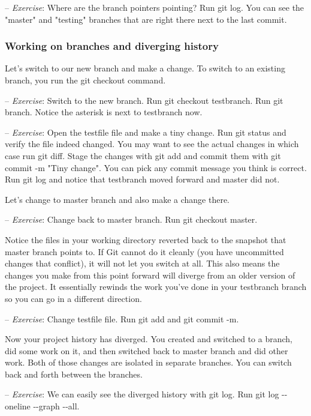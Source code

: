 \documentclass[12pt,a4]{article}
\newcommand{\ilcode}[1]{\textcolor[RGB]{160, 110, 220}{#1}}
\begin{document}
{\sf -- \emph{Exercise}:} Where are the branch pointers pointing? Run
\ilcode{git log}. You can see the "master" and "testing" branches that are right
there next to the last commit.

\subsubsection{Working on branches and diverging history}

Let's switch to our new branch and make a change. To switch to an existing
branch, you run the \ilcode{git checkout} command.

{\sf -- \emph{Exercise}:} Switch to the new branch. Run \ilcode{git checkout
testbranch}. Run \ilcode{git branch}. Notice the asterisk is next to testbranch
now.

{\sf -- \emph{Exercise}:} Open the testfile file and make a tiny change. Run
\ilcode{git status} and verify the file indeed changed. You may want to see the
actual changes in which case run \ilcode{git diff}. Stage the changes with
\ilcode{git add} and commit them with \ilcode{git commit -m "Tiny change"}. You
can pick any commit message you think is correct. Run \ilcode{git log} and
notice that testbranch moved forward and master did not.

Let's change to master branch and also make a change there.

{\sf -- \emph{Exercise}:} Change back to master branch. Run \ilcode{git checkout
master}.

Notice the files in your working directory reverted back to the snapshot that
master branch points to. If Git cannot do it cleanly (you have uncommitted
changes that conflict), it will not let you switch at all. This also means the
changes you make from this point forward will diverge from an older version of
the project. It essentially rewinds the work you've done in your testbranch
branch so you can go in a different direction.

{\sf -- \emph{Exercise}:} Change testfile file. Run \ilcode{git add} and
\ilcode{git commit -m}.

Now your project history has diverged. You created and switched to a branch, did
some work on it, and then switched back to master branch and did other work.
Both of those changes are isolated in separate branches. You can switch back and
forth between the branches.

{\sf -- \emph{Exercise}:} We can easily see the diverged history with
\ilcode{git log}. Run \ilcode{git log -{}-oneline -{}-graph -{}-all}.
\end{document}
